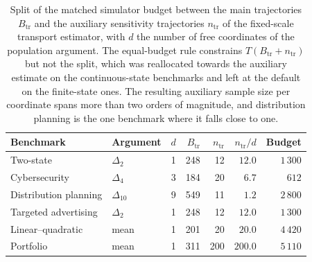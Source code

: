 \begin{table}[H]
\centering
\begin{tabular}{llrrrrr}
\toprule
Benchmark & Argument & $d$ & $B_{\mathrm{tr}}$ & $n_{\mathrm{tr}}$ & $n_{\mathrm{tr}}/d$ & Budget \\
\midrule
Two-state & $\Delta_2$ & 1 & 248 & 12 & $12.0$ & $1\,300$ \\
Cybersecurity & $\Delta_4$ & 3 & 184 & 20 & $6.7$ & $612$ \\
Distribution planning & $\Delta_{10}$ & 9 & 549 & 11 & $1.2$ & $2\,800$ \\
Targeted advertising & $\Delta_2$ & 1 & 248 & 12 & $12.0$ & $1\,300$ \\
Linear--quadratic & mean & 1 & 201 & 20 & $20.0$ & $4\,420$ \\
Portfolio & mean & 1 & 311 & 200 & $200.0$ & $5\,110$ \\
\bottomrule
\end{tabular}
\caption{Split of the matched simulator budget between the main trajectories $B_{\mathrm{tr}}$ and the auxiliary sensitivity trajectories $n_{\mathrm{tr}}$ of the fixed-scale transport estimator, with $d$ the number of free coordinates of the population argument. The equal-budget rule constrains $T(B_{\mathrm{tr}}+n_{\mathrm{tr}})$ but not the split, which was reallocated towards the auxiliary estimate on the continuous-state benchmarks and left at the default on the finite-state ones. The resulting auxiliary sample size per coordinate spans more than two orders of magnitude, and distribution planning is the one benchmark where it falls close to one.}
\label{tab:auxiliary-budget}
\end{table}

